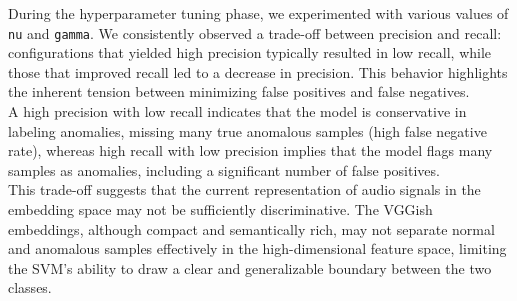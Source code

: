 \documentclass[ngerman]{scrartcl}
\begin{document}
During the hyperparameter tuning phase, we experimented with various values of \texttt{nu} and \texttt{gamma}. We consistently observed a trade-off between precision and recall: configurations that yielded high precision typically resulted in low recall, while those that improved recall led to a decrease in precision. This behavior highlights the inherent tension between minimizing false positives and false negatives.\\ 
A high precision with low recall indicates that the model is conservative in labeling anomalies, missing many true anomalous samples (high false negative rate), whereas high recall with low precision implies that the model flags many samples as anomalies, including a significant number of false positives.\\
This trade-off suggests that the current representation of audio signals in the embedding space may not be sufficiently discriminative. The VGGish embeddings, although compact and semantically rich, may not separate normal and anomalous samples effectively in the high-dimensional feature space, limiting the SVM's ability to draw a clear and generalizable boundary between the two classes.
\end{document}
